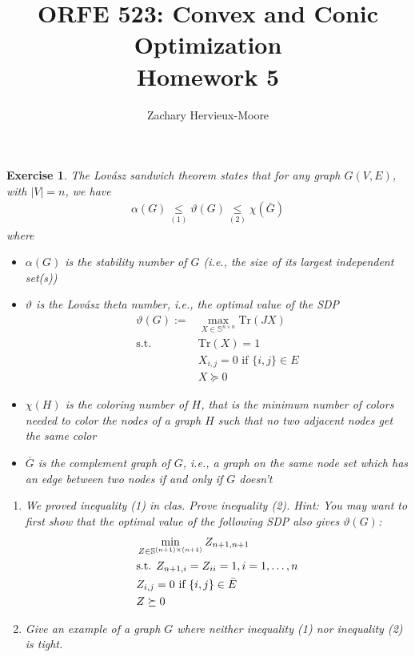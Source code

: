 \documentclass[12pt]{article}
\title{ORFE 523: Convex and Conic Optimization \\ Homework 5}
\author{Zachary Hervieux-Moore}
\date{\displaydate{date}}
\theoremstyle{colon}
\newtheorem{exercise}{Exercise}
\begin{document}
\maketitle

\clearpage

\begin{exercise}
  The Lov{\'a}sz sandwich theorem states that for any graph $G(V,E)$, with $\lvert V \rvert = n$, we have
  \begin{gather*}
    \alpha(G) \underset{(1)}{\leq} \vartheta(G) \underset{(2)}{\leq} \chi (\bar{G})
  \end{gather*}
  where
  \begin{itemize}
      \item $\alpha(G)$ is the stability number of $G$ (i.e., the size of its largest independent set(s))
      \item $\vartheta$ is the Lov{\'a}sz theta number, i.e., the optimal value of the SDP
        \begin{align*}
          \vartheta(G) := &\max_{X \in \mathbb{S}^{n \times n}} \text{Tr}(JX) \\
          \text{s.t. } &\text{Tr}(X) = 1 \\
          &X_{i,j} = 0 \text{ if } \{i,j\} \in E \\
          &X \succeq 0
        \end{align*}
      \item $\chi(H)$ is the coloring number of $H$, that is the minimum number of colors needed to color the nodes of a graph $H$ such that no two adjacent nodes get the same color
      \item $\bar{G}$ is the complement graph of $G$, i.e., a graph on the same node set which has an edge between two nodes if and only if $G$ doesn't
  \end{itemize}
  \begin{enumerate}[label=\arabic*)]
    \item We proved inequality (1) in clas. Prove inequality (2). \textit{Hint:} You may want to first show that the optimal value of the following SDP also gives $\vartheta(G)$:
      \begin{align*}
        &\min_{Z \in \mathbb{S}^{(n+1) \times (n+1)}} Z_{n+1, n+1} \\
        &\text{s.t. } Z_{n+1,i} = Z_{ii} = 1, i = 1, \mathellipsis, n \\
        &Z_{i,j} = 0 \text{ if } \{i,j\} \in \bar{E} \\
        &Z \succeq 0
      \end{align*}
    \item Give an example of a graph $G$ where neither inequality (1) nor inequality (2) is tight.
  \end{enumerate}
\end{exercise}
\end{document}
